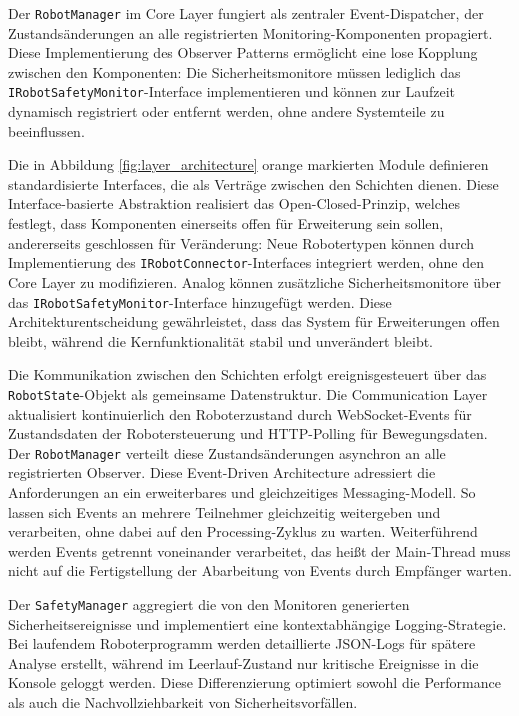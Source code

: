 Der \texttt{RobotManager} im Core Layer fungiert als zentraler
Event-Dispatcher, der Zustandsänderungen an alle registrierten
Monitoring-Komponenten propagiert. Diese Implementierung des Observer Patterns
ermöglicht eine lose Kopplung zwischen den
Komponenten: Die Sicherheitsmonitore müssen
lediglich das \texttt{IRobotSafetyMonitor}-Interface implementieren und können
zur Laufzeit dynamisch registriert oder entfernt werden, ohne andere Systemteile
zu beeinflussen.

Die in Abbildung \ref{fig:layer_architecture}
orange markierten Module definieren standardisierte Interfaces, die als Verträge
zwischen den Schichten dienen. Diese Interface-basierte Abstraktion realisiert
das Open-Closed-Prinzip, welches festlegt, dass Komponenten einerseits offen
für Erweiterung sein sollen, andererseits geschlossen für
Veränderung: Neue Robotertypen können durch Implementierung
des \texttt{IRobotConnector}-Interfaces integriert werden, ohne den Core Layer
zu modifizieren. Analog können zusätzliche Sicherheitsmonitore über das
\texttt{IRobotSafetyMonitor}-Interface hinzugefügt werden. Diese
Architekturentscheidung gewährleistet, dass das System für Erweiterungen offen
bleibt, während die Kernfunktionalität stabil und unverändert bleibt.

Die Kommunikation zwischen den Schichten erfolgt ereignisgesteuert über das
\texttt{RobotState}-Objekt als gemeinsame Datenstruktur. Die Communication Layer
aktualisiert kontinuierlich den Roboterzustand durch WebSocket-Events für
Zustandsdaten der Robotersteuerung und HTTP-Polling für
Bewegungsdaten. Der \texttt{RobotManager}
verteilt diese Zustandsänderungen asynchron an alle registrierten Observer.
Diese Event-Driven Architecture adressiert die Anforderungen an ein
erweiterbares und gleichzeitiges Messaging-Modell. So lassen sich Events
an mehrere Teilnehmer gleichzeitig weitergeben und verarbeiten, ohne dabei auf
den Processing-Zyklus zu warten. Weiterführend werden Events getrennt
voneinander
verarbeitet, das heißt der Main-Thread muss nicht auf die Fertigstellung der
Abarbeitung von Events durch Empfänger warten.

Der \texttt{SafetyManager} aggregiert die von den Monitoren generierten
Sicherheitsereignisse und implementiert eine kontextabhängige Logging-Strategie.
Bei laufendem Roboterprogramm werden detaillierte JSON-Logs für spätere Analyse
erstellt, während im Leerlauf-Zustand nur kritische Ereignisse in die Konsole
geloggt werden. Diese Differenzierung optimiert sowohl die Performance als auch
die Nachvollziehbarkeit von Sicherheitsvorfällen.

